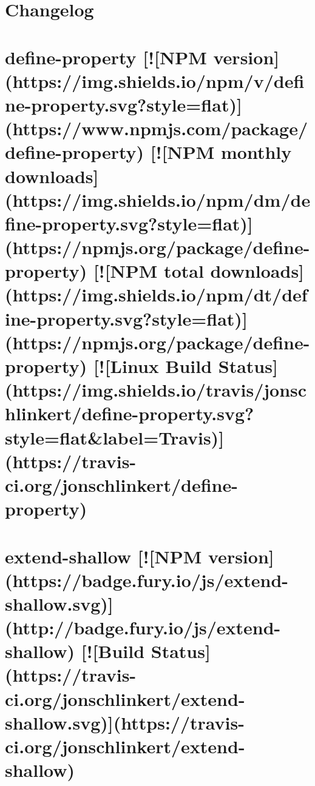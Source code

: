 \documentclass[twoside]{book}
\newcommand{\+}{\discretionary{\mbox{\scriptsize$\hookleftarrow$}}{}{}}
\begin{document}
\chapter{Changelog}
\label{md_dsmacc_vis_degree_node_modules_extglob_changelog}

\chapter{define-\/property \mbox{[}!\mbox{[}N\+PM version\mbox{]}(https\+://img.shields.\+io/npm/v/define-\/property.svg?style=flat)\mbox{]}(https\+://www.npmjs.\+com/package/define-\/property) \mbox{[}!\mbox{[}N\+PM monthly downloads\mbox{]}(https\+://img.shields.\+io/npm/dm/define-\/property.svg?style=flat)\mbox{]}(https\+://npmjs.org/package/define-\/property) \mbox{[}!\mbox{[}N\+PM total downloads\mbox{]}(https\+://img.shields.\+io/npm/dt/define-\/property.svg?style=flat)\mbox{]}(https\+://npmjs.org/package/define-\/property) \mbox{[}!\mbox{[}Linux Build Status\mbox{]}(https\+://img.shields.\+io/travis/jonschlinkert/define-\/property.svg?style=flat\&label=Travis)\mbox{]}(https\+://travis-\/ci.org/jonschlinkert/define-\/property)}
\label{md_dsmacc_vis_degree_node_modules_extglob_node_modules_define-property_README}

\chapter{extend-\/shallow \mbox{[}!\mbox{[}N\+PM version\mbox{]}(https\+://badge.fury.\+io/js/extend-\/shallow.svg)\mbox{]}(http\+://badge.fury.\+io/js/extend-\/shallow) \mbox{[}!\mbox{[}Build Status\mbox{]}(https\+://travis-\/ci.org/jonschlinkert/extend-\/shallow.svg)\mbox{]}(https\+://travis-\/ci.org/jonschlinkert/extend-\/shallow)}
\label{md_dsmacc_vis_degree_node_modules_extglob_node_modules_extend-shallow_README}

\end{document}
